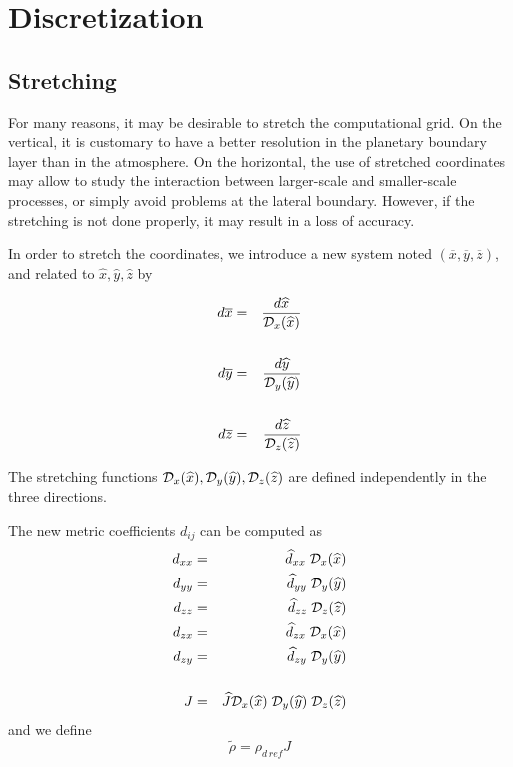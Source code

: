 \chapter{Discretization}
\minitoc


\section{Stretching}

For many reasons, it may be desirable to stretch the computational grid. On
the vertical, it is customary to have a better resolution in the planetary
boundary layer than in the atmosphere. On the horizontal, the use of stretched
coordinates may allow to study the interaction between larger-scale and
smaller-scale processes, or simply avoid problems at the lateral boundary.
However, if the stretching is not done properly, it may result in a loss of
accuracy.

In order to stretch the coordinates, we introduce a new system
noted $(\overline{x},\overline{y},\overline{z})$, and related to
$\widehat{x},\widehat{y},\widehat{z}$ by

\begin{eqnarray}
d\overline{x} & = & \dfrac{d\widehat{x}}{ {\cal D}_x(\widehat{x})}
\\
& & \\
d \overline{y}& = & \dfrac{d\widehat{y}}{ {\cal D}_y(\widehat{y})}
\\
 & & \\
d\overline{z} & = &\dfrac{ d\widehat{z}}{ {\cal D}_z(\widehat{z})}
\end{eqnarray}

The stretching functions
${\cal D}_x(\widehat{x}), {\cal D}_y(\widehat{y}),
{\cal D}_z(\widehat{z})$ are defined independently
in the three directions.


The new metric coefficients $d_{ij}$ can be computed as
\begin{eqnarray}
d_{xx} &=& \widehat{d}_{xx} \;{\cal D}_x(\widehat{x}) \nonumber  \\
d_{yy} &=& \widehat{d}_{yy} \;{\cal D}_y(\widehat{y}) \nonumber  \\
d_{zz} &=& \widehat{d}_{zz} \;{\cal D}_z(\widehat{z})  \\
d_{zx} &=& \widehat{d}_{zx} \;{\cal D}_x(\widehat{x}) \nonumber \\
d_{zy} &=& \widehat{d}_{zy} \;{\cal D}_y(\widehat{y}) \nonumber   \\
\nonumber \\
J&=& \widehat{J} {\cal D}_x(\widehat{x})\;{\cal D}_y(\widehat{y})\; {\cal D}_z
(\widehat{z})
\end{eqnarray}
and we define
\begin{equation}
\tilde{\rho}  = \rho_{d\,ref} J
\end{equation}

